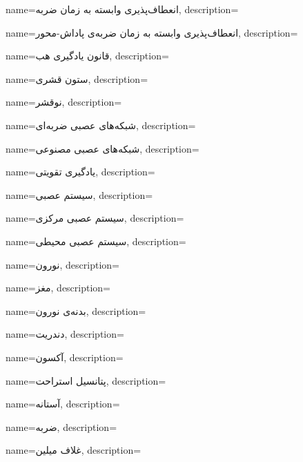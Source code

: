 {
	name={انعطاف‌پذیری وابسته به زمان ضربه},
	description=\hfill{}
}

{
	name={انعطاف‌پذیری وابسته به زمان ضربه‌ی پاداش-محور},
	description=\hfill{}
}

{
    name={قانون یادگیری هب},
    description=\hfill{}
}

{
name={ستون‌ قشری},
description=\hfill{}
}

{
name={نوقشر},
description=\hfill{}
}

{
	name={شبکه‌های عصبی ضربه‌ای},
	description=\hfill{}
}

{
	name={شبکه‌های عصبی مصنوعی},
	description=\hfill{}
}

{
	name={یادگیری تقویتی},
	description=\hfill{}
}

{
	name={سیستم عصبی},
	description=\hfill{}
}

{
	name={سیستم عصبی مرکزی},
	description=\hfill{}
}

{
	name={سیستم عصبی محیطی},
	description=\hfill{}
}

{
	name={نورون},
	description=\hfill{}
}

{
	name={مغز},
	description=\hfill{}
}

{
	name={بدنه‌ی نورون},
	description=\hfill{}
}

{
	name={دندریت},
	description=\hfill{}
}

{
	name={آکسون},
	description=\hfill{}
}

{
	name={پتانسیل استراحت},
	description=\hfill{}
}

{
	name={آستانه},
	description=\hfill{}
}

{
	name={ضربه},
	description=\hfill{}
}

{
	name={غلاف میلین},
	description=\hfill{}
}

